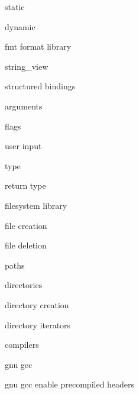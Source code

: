          static
        
         dynamic 
        
         fmt format library
          
         string_view
        
         structured bindings
        
         arguments 
        
         flags 
        
         user input 
        
         type 
        
         return type 
        
         filesystem library
         
         file creation 
        
         file deletion 
        
         paths 
        
         directories

         directory creation
        
         directory iterators 
        
         compilers 
        
         gnu gcc
        
         gnu gcc enable precompiled headers
        
